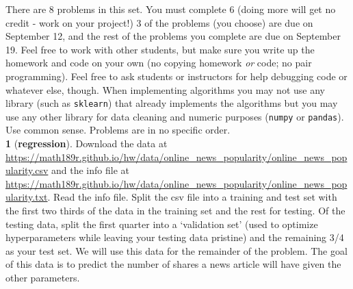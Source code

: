 \documentclass[12pt,letterpaper,fleqn]{hmcpset}
\begin{document}
There are 8 problems in this set. You must complete 6 (doing more will get no
credit - work on your project!) 3 of the problems (you choose) are due on September 12,
and the rest of the problems you complete are due on September 19. Feel
free to work with other students, but make sure you write up the homework
and code on your own (no copying homework \textit{or} code; no pair programming).
Feel free to ask students or instructors for help debugging code or whatever else,
though.
When implementing algorithms you may not use any library (such as \texttt{sklearn})
that already implements the algorithms but you may use any other library for
data cleaning and numeric purposes (\texttt{numpy} or \texttt{pandas}). Use common
sense.
Problems are in no specific order.\\[1em]


\textbf{1} (\textbf{regression}). Download the data at 
\url{https://math189r.github.io/hw/data/online_news_popularity/online_news_popularity.csv}
and the info file at
\url{https://math189r.github.io/hw/data/online_news_popularity/online_news_popularity.txt}.
Read the info file. Split the csv file into a training and test set with
the first two thirds of the data in the training set and the rest for testing.
Of the testing data, split the first quarter into a `validation set' (used
to optimize hyperparameters while leaving your testing data pristine) and
the remaining 3/4 as your test set.
We will use this data for the remainder of the problem. The goal of this data
is to predict the number of shares a news article will have given the other
parameters.
\end{document}
